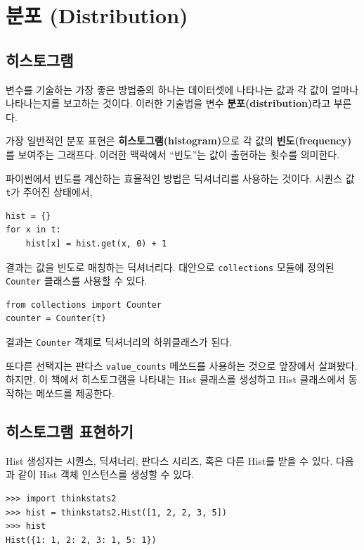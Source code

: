 \chapter{분포 (Distribution)}
\label{descriptive}


\section{히스토그램}
\label{histograms}

변수를 기술하는 가장 좋은 방법중의 하나는 데이터셋에 나타나는 값과
각 값이 얼마나 나타나는지를 보고하는 것이다.
이러한 기술법을 변수 {\bf 분포(distribution)}라고 부른다.

가장 일반적인 분포 표현은 {\bf 히스토그램(histogram)}으로 각 값의 
{\bf 빈도(frequency)}를 보여주는 그래프다. 이러한 맥락에서 ``빈도''는
값이 출현하는 횟수를 의미한다. 

파이썬에서 빈도를 계산하는 효율적인 방법은 딕셔너리를 사용하는 것이다.
시퀀스 값 {\tt t}가 주어진 상태에서,
%
\begin{verbatim}
hist = {}
for x in t:
    hist[x] = hist.get(x, 0) + 1
\end{verbatim}

결과는 값을 빈도로 매칭하는 딕셔너리다. 대안으로 
{\tt collections} 모듈에 정의된 {\tt Counter} 클래스를 사용할 수 있다.


\begin{verbatim}
from collections import Counter
counter = Counter(t)
\end{verbatim}

결과는 {\tt Counter} 객체로 딕셔너리의 하위클래스가 된다.

또다른 선택지는 판다스 \verb"value_counts" 메쏘드를 사용하는 것으로 앞장에서 살펴봤다.
하지만, 이 책에서 히스토그램을 나타내는 Hist 클래스를 생성하고 Hist 클래스에서 동작하는 메쏘드를 제공한다.



\section{히스토그램 표현하기}

Hist 생성자는 시퀀스, 딕셔너리, 판다스 시리즈, 혹은 다른 Hist를 받을 수 있다.
다음과 같이 Hist 객체 인스턴스를 생성할 수 있다.

%
\begin{verbatim}
>>> import thinkstats2
>>> hist = thinkstats2.Hist([1, 2, 2, 3, 5])
>>> hist
Hist({1: 1, 2: 2, 3: 1, 5: 1})
\end{verbatim}

